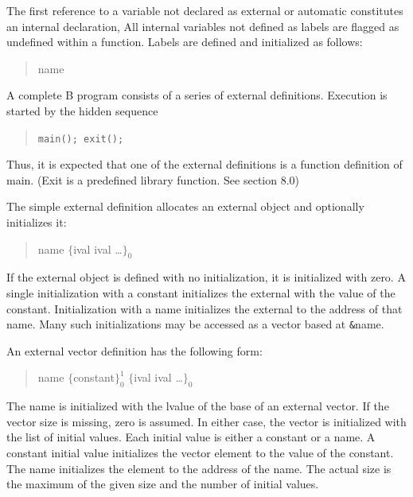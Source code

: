 \documentclass[12pt]{report}
\begin{document}

The first reference to a variable not declared as external or
automatic constitutes an internal declaration, All internal variables
not defined as labels are flagged as undefined within a
function. Labels are defined and initialized as follows:
\begin{quote}
  name \token{:}
\end{quote}


A complete B program consists of a series of external
definitions. Execution is started by the hidden sequence
\begin{quote}
  \verb|main(); exit();|
\end{quote}

Thus, it is expected that one of the external definitions is a
function definition of main. (Exit is a predefined library
function. See section 8.0)
        

The simple external definition allocates an external object and
optionally initializes it:
\begin{quote}
  name $\{$ival \token{,} ival \ldots$\}_0^{}$ \token{;}
\end{quote}
If the external object is defined with no initialization, it is
initialized with zero. A single initialization with a constant
initializes the external with the value of the
constant. Initialization with a name initializes the external to the
address of that name. Many such initializations may be accessed as a
vector based at \verb|&|name.
        

An external vector definition has the following form:
\begin{quote}
  name \token{[} $\{$constant$\}_0^1$ \token{]}
  $\{$ival \token{,} ival \ldots$\}_0^{}$ \token{;}
\end{quote}
The name is initialized with the lvalue of the base of an external
vector. If the vector size is missing, zero is assumed. In either
case, the vector is initialized with the list of initial values. Each
initial value is either a constant or a name. A constant initial value
initializes the vector element to the value of the constant. The name
initializes the element to the address of the name. The actual size is
the maximum of the given size and the number of initial values.
\end{document}
